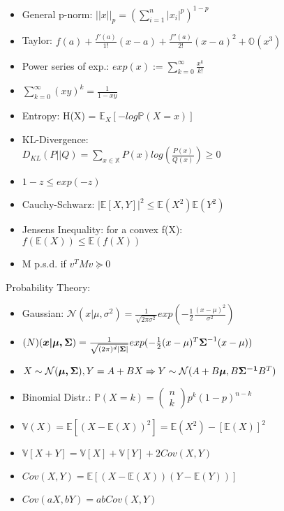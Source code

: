\begin{itemize}
    \item General p-norm: $||x||_p = (\sum_{i=1}^{n}|x_i|^p)^{1-p}$
    \item Taylor: $f(a) + \frac{f'(a)}{1!}(x-a)  + \frac{f''(a)}{2!}(x-a)^2 + \mathbb{O}(x^3)$
    \item Power series of exp.: $exp(x) := \sum_{k=0}^{\infty}\frac{x^k}{k!}$
    \item $\sum_{k=0}^\infty (xy)^k = \frac{1}{1-xy}$
    \item Entropy: H(X) = $\mathbb{E}_X\left[-log\mathbb{P}(X=x)\right]$
    \item KL-Divergence: \\$D_{KL}(P||Q)=\sum_{x\in \mathbb{X}}P(x)log\left(\frac{P(x)}{Q(x)}\right) \geq 0$
    \item $1-z \leq exp(-z)$
    \item Cauchy-Schwarz: $|\mathbb{E}\left[X,Y\right]|^2 \leq\mathbb{E}(X^2)\mathbb{E}(Y^2)$
    \item Jensens Inequality: for a convex f(X): \\$f(\mathbb{E}(X))\leq\mathbb{E}(f(X))$
    \item M p.s.d. if $v^T M v \succeq 0$
\end{itemize}
Probability Theory:
\begin{itemize}
    \item Gaussian: $\mathcal{N}(x|\mu,\sigma^2) = \frac{1}{\sqrt{2\pi\sigma^2}}exp(-\frac{1}{2}\frac{(x-\mu)^2}{\sigma^2})$
    \item $\mathcal(N)(\boldsymbol{x|\mu,\Sigma}) = \\\frac{1}{\sqrt{(2\pi)^d|\boldsymbol{\Sigma}|}}exp(-\frac{1}{2}(x - \mu)^T\boldsymbol{\Sigma}^{-1}(x-\mu))$
    \item $X\sim\mathcal{N}(\boldsymbol{\mu,\Sigma}), Y=A + BX \Rightarrow \\Y \sim \mathcal{N}(A + B\boldsymbol{\mu},B\boldsymbol{\Sigma^{-1}}B^T)$
    \item Binomial Distr.: $\mathbb{P}(X=k)=\begin{pmatrix}
        n\\k
    \end{pmatrix}p^k(1-p)^{n-k}$
    \item $\mathbb{V}(X) = \mathbb{E}\left[(X-\mathbb{E}(X))^2\right]=\mathbb{E}(X^2) - \left[\mathbb{E}(X)\right]^2$
    \item $\mathbb{V}\left[X + Y\right] = \mathbb{V}\left[X\right] + \mathbb{V}\left[Y\right] + 2 Cov(X,Y)$
    \item $Cov(X,Y) = \mathbb{E}\left[(X-\mathbb{E}(X))(Y-\mathbb{E}(Y))\right]$
    \item $Cov(aX,bY) = abCov(X,Y)$
\end{itemize}

